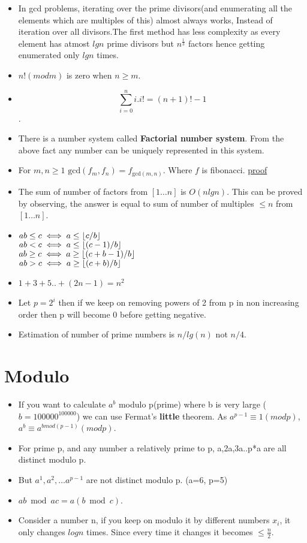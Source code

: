 \documentclass[../Notes.tex]{subfiles}
\begin{document}
\begin{itemize}
	\item In gcd problems, iterating over the prime divisors(and enumerating all the elements which are multiples of this) almost always works, Instead of iteration over all divisors.The first method has less complexity as every element has atmost $lgn$ prime divisors but $n^\frac{1}{3}$ factors hence getting enumerated only $lgn$ times.
	\item $n!(mod m)$ is zero when $n\geq m$.
	\item $$\sum_{i=0}^{n}i.i!=(n+1)!-1$$. 
	\item There is a number system called \textbf{Factorial number system}.
	From the above fact any number can be uniquely represented in this system.
	\item For $m,n\ge 1$ $\mbox{gcd}(f_{m},f_{n})=f_{\text{gcd}(m,n)}$. Where $f$ is fibonacci. \href{./Material/fibonacci gcd.pdf}{proof}
	\item The sum of number of factors from $[1\ldots n]$ is $O(nlgn)$. This can be proved by observing, the answer is equal to sum of number of multiples $\leq n$ from $[1\ldots n]$.
	\item $ab\leq c \iff a\leq \floor*{c/b}$ \\
	$ab<c \iff a\leq \floor*{(c-1)/b}$\\
	$ab\geq c \iff a\geq \floor*{(c+b-1)/b}$ \\
	$ab> c \iff a\geq \floor*{(c+b)/b}$
	
	\item $1+3+5..+(2n-1) = n^2$
	\item Let $p = 2^i$ then if we keep on removing powers of 2 from p in non increasing order then p will become 0 before getting negative.
	\item Estimation of number of prime numbers is $n/lg(n)$ not $n/4$.
\end{itemize}

\section{Modulo}
\begin{itemize}
	\item If you want to calculate $a^b$ modulo p(prime) where b is very large ($b=100000^{100000}$) we can use Fermat's \textbf{little} theorem. As $a^{p-1}\equiv 1(mod p)$, $a^b\equiv a^{bmod(p-1)}(mod p)$.  
	\item For prime p, and any number a relatively prime to p, a,2a,3a..p*a are all distinct modulo p.
	\item But $a^1,a^2,\dotsc a^{p-1}$ are not distinct modulo p. (a=6, p=5)
	\item $ab \bmod ac = a(b \bmod c)$.
	\item Consider a number n, if you keep on modulo it by different numbers $x_i$, it only changes $logn$ times. Since every time it changes it becomes $\leq \frac{n}{2}$.
\end{itemize}
\end{document}

